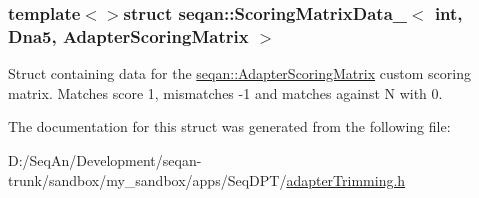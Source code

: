 \subsubsection*{template$<$$>$struct seqan\-::\-Scoring\-Matrix\-Data\-\_\-$<$ int, Dna5, Adapter\-Scoring\-Matrix $>$}

Struct containing data for the \hyperlink{structseqan_1_1_adapter_scoring_matrix}{seqan\-::\-Adapter\-Scoring\-Matrix} custom scoring matrix. Matches score 1, mismatches -\/1 and matches against N with 0. 

The documentation for this struct was generated from the following file\-:\begin{DoxyCompactItemize}
\item 
D\-:/\-Seq\-An/\-Development/seqan-\/trunk/sandbox/my\-\_\-sandbox/apps/\-Seq\-D\-P\-T/\hyperlink{adapter_trimming_8h}{adapter\-Trimming.\-h}\end{DoxyCompactItemize}
